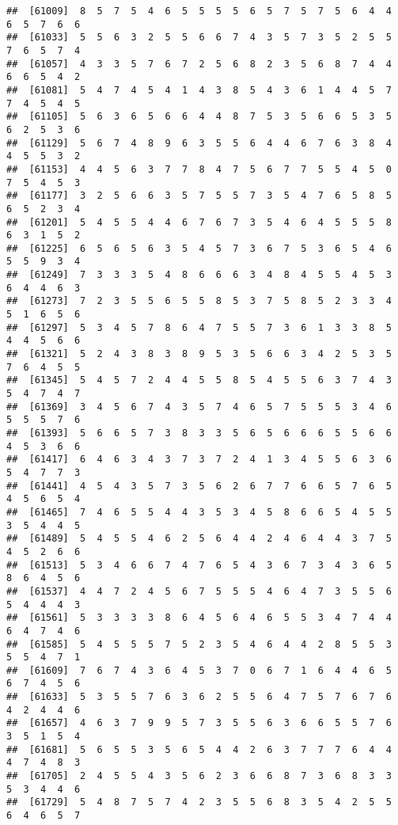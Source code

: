\documentclass[
]{book}
\begin{document}
\begin{verbatim}
##  [61009]  8  5  7  5  4  6  5  5  5  5  6  5  7  5  7  5  6  4  4  6  5  7  6  6
##  [61033]  5  5  6  3  2  5  5  6  6  7  4  3  5  7  3  5  2  5  5  7  6  5  7  4
##  [61057]  4  3  3  5  7  6  7  2  5  6  8  2  3  5  6  8  7  4  4  6  6  5  4  2
##  [61081]  5  4  7  4  5  4  1  4  3  8  5  4  3  6  1  4  4  5  7  7  4  5  4  5
##  [61105]  5  6  3  6  5  6  6  4  4  8  7  5  3  5  6  6  5  3  5  6  2  5  3  6
##  [61129]  5  6  7  4  8  9  6  3  5  5  6  4  4  6  7  6  3  8  4  4  5  5  3  2
##  [61153]  4  4  5  6  3  7  7  8  4  7  5  6  7  7  5  5  4  5  0  7  5  4  5  3
##  [61177]  3  2  5  6  6  3  5  7  5  5  7  3  5  4  7  6  5  8  5  6  5  2  3  4
##  [61201]  5  4  5  5  4  4  6  7  6  7  3  5  4  6  4  5  5  5  8  6  3  1  5  2
##  [61225]  6  5  6  5  6  3  5  4  5  7  3  6  7  5  3  6  5  4  6  5  5  9  3  4
##  [61249]  7  3  3  3  5  4  8  6  6  6  3  4  8  4  5  5  4  5  3  6  4  4  6  3
##  [61273]  7  2  3  5  5  6  5  5  8  5  3  7  5  8  5  2  3  3  4  5  1  6  5  6
##  [61297]  5  3  4  5  7  8  6  4  7  5  5  7  3  6  1  3  3  8  5  4  4  5  6  6
##  [61321]  5  2  4  3  8  3  8  9  5  3  5  6  6  3  4  2  5  3  5  7  6  4  5  5
##  [61345]  5  4  5  7  2  4  4  5  5  8  5  4  5  5  6  3  7  4  3  5  4  7  4  7
##  [61369]  3  4  5  6  7  4  3  5  7  4  6  5  7  5  5  5  3  4  6  5  5  5  7  6
##  [61393]  5  6  6  5  7  3  8  3  3  5  6  5  6  6  6  5  5  6  6  4  5  3  6  6
##  [61417]  6  4  6  3  4  3  7  3  7  2  4  1  3  4  5  5  6  3  6  5  4  7  7  3
##  [61441]  4  5  4  3  5  7  3  5  6  2  6  7  7  6  6  5  7  6  5  4  5  6  5  4
##  [61465]  7  4  6  5  5  4  4  3  5  3  4  5  8  6  6  5  4  5  5  3  5  4  4  5
##  [61489]  5  4  5  5  4  6  2  5  6  4  4  2  4  6  4  4  3  7  5  4  5  2  6  6
##  [61513]  5  3  4  6  6  7  4  7  6  5  4  3  6  7  3  4  3  6  5  8  6  4  5  6
##  [61537]  4  4  7  2  4  5  6  7  5  5  5  4  6  4  7  3  5  5  6  5  4  4  4  3
##  [61561]  5  3  3  3  3  8  6  4  5  6  4  6  5  5  3  4  7  4  4  6  4  7  4  6
##  [61585]  5  4  5  5  5  7  5  2  3  5  4  6  4  4  2  8  5  5  3  5  5  4  7  1
##  [61609]  7  6  7  4  3  6  4  5  3  7  0  6  7  1  6  4  4  6  5  6  7  4  5  6
##  [61633]  5  3  5  5  7  6  3  6  2  5  5  6  4  7  5  7  6  7  6  4  2  4  4  6
##  [61657]  4  6  3  7  9  9  5  7  3  5  5  6  3  6  6  5  5  7  6  3  5  1  5  4
##  [61681]  5  6  5  5  3  5  6  5  4  4  2  6  3  7  7  7  6  4  4  4  7  4  8  3
##  [61705]  2  4  5  5  4  3  5  6  2  3  6  6  8  7  3  6  8  3  3  5  3  4  4  6
##  [61729]  5  4  8  7  5  7  4  2  3  5  5  6  8  3  5  4  2  5  5  6  4  6  5  7

\end{verbatim}
\end{document}
